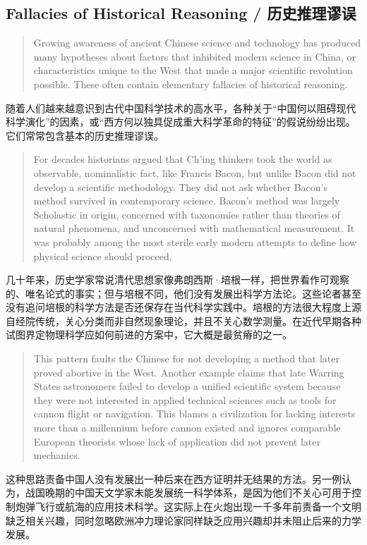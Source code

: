 \documentclass[UTF8,zihao=-4]{ctexart}
\newenvironment{enblock}
  {\par\smallskip\noindent{\scriptsize\bfseries English}\par\begin{quote}\small}
  {\end{quote}}
\newenvironment{zhblock}
  {\par\noindent{\scriptsize\bfseries 中文}\par}
  {\par\medskip}
\begin{document}
\subsection*{Fallacies of Historical Reasoning / 历史推理谬误}

\begin{enblock}
Growing awareness of ancient Chinese science and technology has produced many hypotheses about factors that inhibited modern science in China, or characteristics unique to the West that made a major scientific revolution possible. These often contain elementary fallacies of historical reasoning.
\end{enblock}
\begin{zhblock}
随着人们越来越意识到古代中国科学技术的高水平，各种关于“中国何以阻碍现代科学演化”的因素，或“西方何以独具促成重大科学革命的特征”的假说纷纷出现。它们常常包含基本的历史推理谬误。
\end{zhblock}

\begin{enblock}
For decades historians argued that Ch'ing thinkers took the world as observable, nominalistic fact, like Francis Bacon, but unlike Bacon did not develop a scientific methodology. They did not ask whether Bacon's method survived in contemporary science. Bacon's method was largely Scholastic in origin, concerned with taxonomies rather than theories of natural phenomena, and unconcerned with mathematical measurement. It was probably among the most sterile early modern attempts to define how physical science should proceed.
\end{enblock}
\begin{zhblock}
几十年来，历史学家常说清代思想家像弗朗西斯·培根一样，把世界看作可观察的、唯名论式的事实；但与培根不同，他们没有发展出科学方法论。这些论者甚至没有追问培根的科学方法是否还保存在当代科学实践中。培根的方法很大程度上源自经院传统，关心分类而非自然现象理论，并且不关心数学测量。在近代早期各种试图界定物理科学应如何前进的方案中，它大概是最贫瘠的之一。
\end{zhblock}

\begin{enblock}
This pattern faults the Chinese for not developing a method that later proved abortive in the West. Another example claims that late Warring States astronomers failed to develop a unified scientific system because they were not interested in applied technical sciences such as tools for cannon flight or navigation. This blames a civilization for lacking interests more than a millennium before cannon existed and ignores comparable European theorists whose lack of application did not prevent later mechanics.
\end{enblock}
\begin{zhblock}
这种思路责备中国人没有发展出一种后来在西方证明并无结果的方法。另一例认为，战国晚期的中国天文学家未能发展统一科学体系，是因为他们不关心可用于控制炮弹飞行或航海的应用技术科学。这实际上在火炮出现一千多年前责备一个文明缺乏相关兴趣，同时忽略欧洲冲力理论家同样缺乏应用兴趣却并未阻止后来的力学发展。
\end{zhblock}
\end{document}
